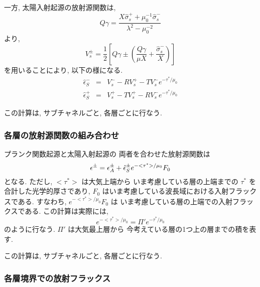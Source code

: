 一方,  太陽入射起源の放射源関数は,
\begin{equation}
  Q\gamma = \frac{X\hat{\sigma}_s^+ + \mu_0^{-1} \hat{\sigma}_s^-}
                 {\lambda^2 - \mu_0^{-2} }
\end{equation}
より,
\begin{equation}
  V_s^\pm = \frac{1}{2} \left[
             Q\gamma \pm \left( \frac{Q\gamma}{\mu X} 
                                + \frac{\hat{\sigma}_s^-}{X} \right)
                        \right]
\end{equation}
を用いることにより, 以下の様になる.
\begin{eqnarray}
  \hat{\epsilon}_S^- & = & V_s^- - R V_s^+ - T V_s^- e^{-\tau^*/\mu_0} \\
  \hat{\epsilon}_S^+ & = & V_s^+ - T V_s^+ - R V_s^- e^{-\tau^*/\mu_0}
\end{eqnarray}

この計算は, サブチャネルごと, 各層ごとに行なう.

\subsubsection{各層の放射源関数の組み合わせ}

プランク関数起源と太陽入射起源の
両者を合わせた放射源関数は
\begin{equation}
  \epsilon^\pm  = 
  \epsilon_A^\pm + \hat{\epsilon}_S^\pm e^{-<\tau^*>/\mu_0} F_0 \\
\end{equation}
となる. ただし, $<\tau^*>$ は大気上端から
いま考慮している層の上端までの
$\tau^*$ を合計した光学的厚さであり, 
$F_0$ はいま考慮している波長域における入射フラックスである.
すなわち, $e^{-<\tau^*>/\mu_0} F_0$ は
いま考慮している層の上端での入射フラックスである.
%
この計算は実際には, 
\begin{equation}
  e^{-<\tau^*>/\mu_0} = \Pi' e^{-\tau^*/\mu_0}
\end{equation}
のように行なう. $\Pi'$ は大気最上層から
今考えている層の1つ上の層までの積を表す.

この計算は, サブチャネルごと, 各層ごとに行なう.

\subsubsection{各層境界での放射フラックス }

